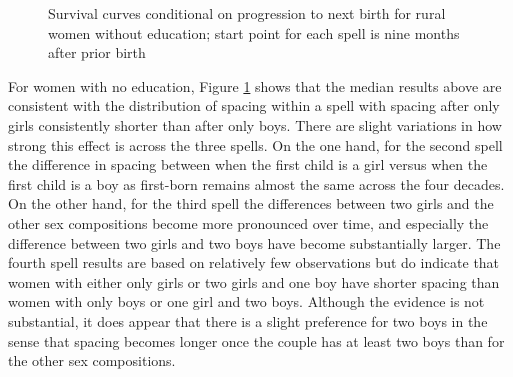 \documentclass[12pt,letterpaper]{article}
\begin{document}
\begin{figure}[htpb]
{\begin{minipage}{0.46\textwidth}
        \captionsetup[subfigure]{labelformat=empty,position=top,captionskip=-1pt,farskip=-0.5pt}
        \captionsetup[subfigure]{labelformat=parens}
    \end{minipage}
} 
\setcounter{subfigure}{4}
\caption{
Survival curves conditional on progression to next birth for rural women without
education; start point for each spell is nine months after prior birth
}
\label{fig:pps_low}
\end{figure}

For women with no education, Figure \ref{fig:pps_low} shows that the median results
above are consistent with the distribution of spacing within a spell with spacing 
after only girls consistently shorter than after only boys.
There are slight variations in how strong this effect is across the three spells.
On the one hand, for the second spell the difference in spacing between
when the first child is a girl versus when the first child is a boy as
first-born remains almost the same across the four decades.
On the other hand, for the third spell the differences between two girls and 
the other sex compositions become more pronounced over time, and especially
the difference between two girls and two boys have become substantially larger.
The fourth spell results are based on relatively few observations but do
indicate that women with either only girls or two girls and one boy have
shorter spacing than women with only boys or one girl and two boys.
Although the evidence is not substantial, it does appear that there is a slight
preference for two boys in the sense that spacing becomes longer once the couple
has at least two boys than for the other sex compositions.
\end{document}
